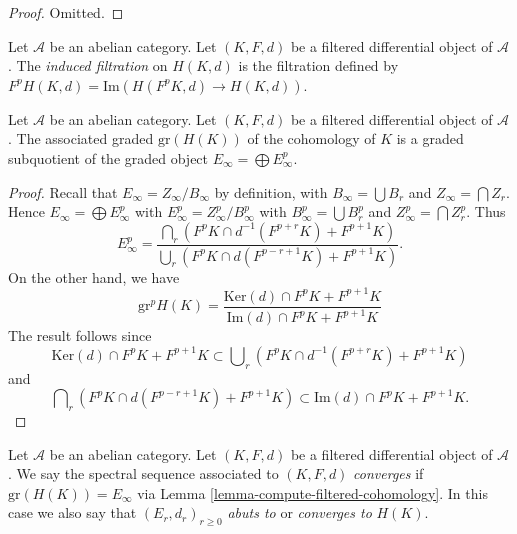 \begin{proof}
Omitted.
\end{proof}

\begin{definition}
\label{definition-filtration-cohomology-filtered-differential}
Let $\mathcal{A}$ be an abelian category.
Let $(K, F, d)$ be a filtered differential object of $\mathcal{A}$.
The {\it induced filtration} on $H(K, d)$ is the filtration defined
by $F^pH(K, d) = \text{Im}(H(F^pK, d) \to H(K, d))$.
\end{definition}

\begin{lemma}
\label{lemma-compute-filtered-cohomology}
Let $\mathcal{A}$ be an abelian category.
Let $(K, F, d)$ be a filtered differential object of $\mathcal{A}$.
The associated graded $\text{gr}(H(K))$ of the cohomology of
$K$ is a graded subquotient of the graded object
$E_\infty = \bigoplus E_\infty^p$.
\end{lemma}

\begin{proof}
Recall that $E_\infty = Z_\infty/B_\infty$ by definition, with
$B_\infty = \bigcup B_r$ and $Z_\infty = \bigcap Z_r$. Hence
$E_\infty = \bigoplus E_\infty^p$ with $E_\infty^p = Z_\infty^p/B_\infty^p$
with $B_\infty^p = \bigcup B_r^p$ and $Z_\infty^p = \bigcap Z_r^p$. Thus
$$
E_\infty^p =
\frac{\bigcap_r (F^pK \cap d^{-1}(F^{p + r}K) + F^{p + 1}K)}
{\bigcup_r (F^pK \cap d(F^{p - r + 1}K) + F^{p + 1}K)}.
$$
On the other hand, we have
$$
\text{gr}^p H(K) =
\frac{\text{Ker}(d) \cap F^pK + F^{p + 1}K}
{\text{Im}(d) \cap F^pK + F^{p + 1}K}
$$
The result follows since
\begin{equation}
\label{equation-on-top}
\text{Ker}(d) \cap F^pK + F^{p + 1}K
\subset
\bigcup\nolimits_r \left(F^pK \cap d^{-1}(F^{p + r}K) + F^{p + 1}K\right)
\end{equation}
and
\begin{equation}
\label{equation-at-bottom}
\bigcap\nolimits_r \left(F^pK \cap d(F^{p - r + 1}K) + F^{p + 1}K\right)
\subset
\text{Im}(d) \cap F^pK + F^{p + 1}K.
\end{equation}
\end{proof}

\begin{definition}
\label{definition-filtered-differential-ss-converges}
Let $\mathcal{A}$ be an abelian category.
Let $(K, F, d)$ be a filtered differential object of $\mathcal{A}$.
We say the spectral sequence associated to $(K, F, d)$
{\it converges} if $\text{gr}(H(K)) = E_{\infty}$ via
Lemma \ref{lemma-compute-filtered-cohomology}.
In this case we also say that $(E_r, d_r)_{r \geq 0}$ {\it abuts to}
or {\it converges to} $H(K)$.
\end{definition}

